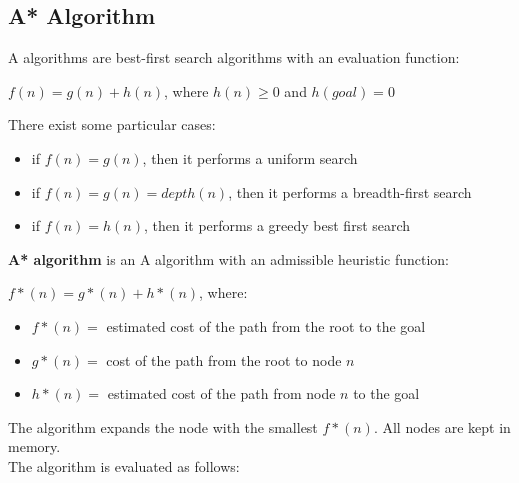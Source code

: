 \documentclass{article}
\begin{document}
\subsection{A* Algorithm}
A algorithms are best-first search algorithms with an evaluation function:
\begin{center}
    $f(n) = g(n) + h(n)$, where $h(n) \geq 0$ and $h(goal) = 0$
\end{center}
There exist some particular cases:
\begin{itemize}
    \item if $f(n) = g(n)$, then it performs a uniform search
    \item if $f(n) = g(n) = depth(n)$, then it performs a breadth-first search
    \item if $f(n) = h(n)$, then it performs a greedy best first search
\end{itemize}
\textbf{A* algorithm} is an A algorithm with an admissible heuristic function:
\begin{center}
    $f*(n) = g*(n) + h*(n)$, where:
\end{center}
\begin{itemize}
    \item $f*(n) =$ estimated cost of the path from the root to the goal
    \item $g*(n) =$ cost of the path from the root to node $n$
    \item $h*(n) =$ estimated cost of the path from node $n$ to the goal
\end{itemize}
The algorithm expands the node with the smallest $f*(n)$. All nodes are kept in memory. \\
The algorithm is evaluated as follows:
\end{document}
